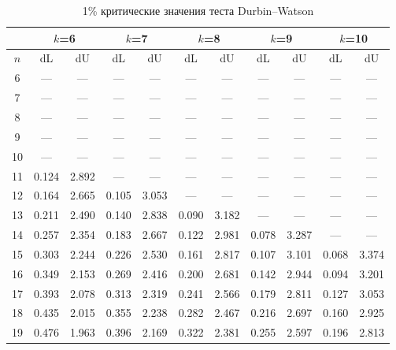 \documentclass[12pt]{article}
\begin{document}
\begin{table}
\caption{1\% критические значения теста Durbin--Watson}
\begin{center}
{\footnotesize
\begin{tabular}{|c|c|c|c|c|c|c|c|c|c|c|}
  \hline

& \multicolumn{2}{c|}{$k$=6} & \multicolumn{2}{c|}{$k$=7}&
\multicolumn{2}{c|}{$k$=8}& \multicolumn{2}{c|}{$k$=9} & \multicolumn{2}{c|}{$k$=10} \\
\hline

$n$ &dL &dU& dL& dU &dL &dU& dL &dU &dL& dU\\ \hline


6&---&
---&---&---&---&---&---&---&---&---\\


7&---&---&---&
---&---&---&---&---&---&---\\


8&---&---&---&---&---&
---&---&---&---&---\\


9&---&---&---&---&---&
---&---&---&---&---\\


10&---&---&---&---&---&
---&---&---&---&---\\


11&0.124&2.892&---&---&---&---&---&---&---&---\\


12&0.164&2.665&
0.105&3.053&---&---&---&---&---&---\\


13&0.211&2.490&0.140&2.838&
0.090&3.182&---&---&---&---\\


14&0.257&2.354&0.183&2.667&0.122&2.981&
0.078&3.287&---&---\\


15&0.303&2.244&0.226&2.530&0.161&2.817&0.107&3.101&
0.068&3.374\\


16&0.349&2.153&0.269&2.416&0.200&2.681&0.142&2.944&0.094&3.201\\


17&0.393&
2.078&0.313&2.319&0.241&2.566&0.179&2.811&0.127&3.053\\


18&0.435&2.015&0.355&
2.238&0.282&2.467&0.216&2.697&0.160&2.925\\


19&0.476&1.963&0.396&2.169&0.322&
2.381&0.255&2.597&0.196&2.813\\



\end{tabular}}
\end{center}
\end{table}
\end{document}
